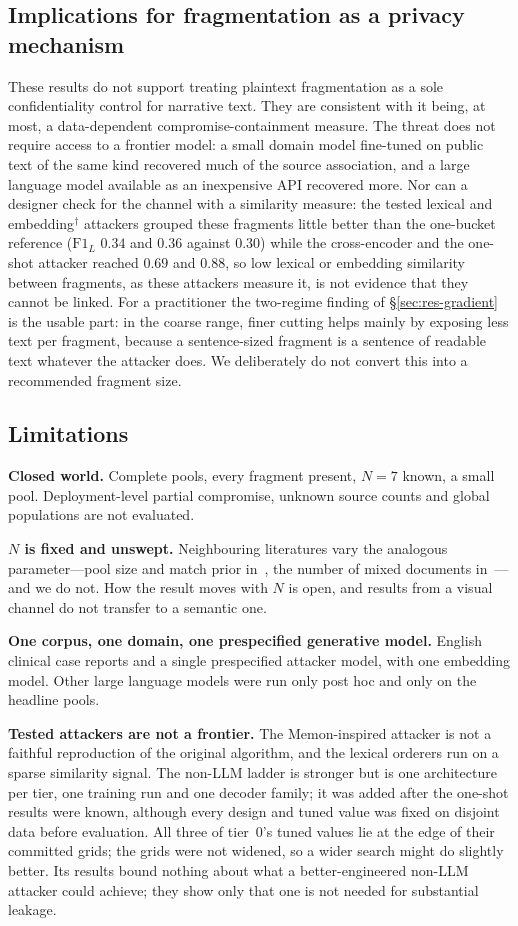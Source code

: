 \documentclass[sigconf,review]{acmart}
\newcommand{\FL}{\ensuremath{\mathrm{F1}_{L}}}
\newcommand{\posthoc}{\ensuremath{^{\dagger}}}
\begin{document}
\subsection{Implications for fragmentation as a privacy mechanism}
These results do not support treating plaintext fragmentation as a sole
confidentiality control for narrative text. They are consistent with it being,
at most, a data-dependent compromise-containment measure. The threat does not
require access to a frontier model: a small domain model fine-tuned on public
text of the same kind recovered much of the source association, and a
large language model available as an inexpensive API recovered more. Nor can a
designer check for the channel with a similarity measure: the tested lexical
and embedding\posthoc{} attackers grouped these fragments little better than
the one-bucket reference ($\FL$ $0.34$ and $0.36$ against $0.30$) while the
cross-encoder and the one-shot attacker reached $0.69$ and $0.88$, so low
lexical or embedding similarity between fragments, as these attackers measure
it, is not evidence that they cannot be linked. For a practitioner
the two-regime finding of \S\ref{sec:res-gradient} is the usable part: in the
coarse range, finer cutting helps mainly by exposing less text per fragment,
because a sentence-sized fragment is a sentence of readable text whatever the
attacker does. We deliberately do not convert this into a recommended fragment
size.

\subsection{Limitations}
\label{sec:limitations}
\textbf{Closed world.} Complete pools, every fragment present, $N=7$ known, a
small pool. Deployment-level partial compromise, unknown source counts and
global populations are not evaluated.

\textbf{$N$ is fixed and unswept.} Neighbouring literatures vary the analogous
parameter---pool size and match prior in~\cite{lermen2026}, the number of mixed
documents in~\cite{paixao2020}---and we do not. How the result moves with $N$
is open, and results from a visual channel do not transfer to a semantic one.

\textbf{One corpus, one domain, one prespecified generative model.} English
clinical case reports and a single prespecified attacker model, with one
embedding model. Other large language models were run only post hoc and only
on the headline pools.

\textbf{Tested attackers are not a frontier.} The Memon-inspired attacker is
not a faithful reproduction of the original algorithm, and the lexical
orderers run on a sparse similarity signal. The non-LLM ladder is stronger but
is one architecture per tier, one training run and one decoder family; it was
added after the one-shot results were known, although every design and tuned
value was fixed on disjoint data before evaluation. All three of tier~0's
tuned values lie at the edge of their committed grids; the grids were not
widened, so a wider search might do slightly better. Its results bound nothing
about what a better-engineered non-LLM attacker could achieve; they show only
that one is not needed for substantial leakage.
\end{document}
